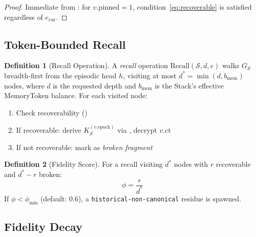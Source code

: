 \documentclass[11pt,twocolumn]{article}
\theoremstyle{definition}
\newtheorem{definition}{Definition}[section]
\theoremstyle{plain}
\theoremstyle{remark}
\begin{document}
\begin{proof}
Immediate from : for $v.\mathrm{pinned} = 1$, condition~\eqref{eq:recoverable} is satisfied regardless of $e_{\mathrm{cur}}$.
\end{proof}

\subsection{Token-Bounded Recall}

\begin{definition}[Recall Operation]\label{def:recall}
A \emph{recall} operation $\mathrm{Recall}(\mathcal{S}, d, e)$ walks $G_\mathcal{S}$ breadth-first from the episodic head $h$, visiting at most $d^* = \min(d, b_{\mathrm{mem}})$ nodes, where $d$ is the requested depth and $b_{\mathrm{mem}}$ is the Stack's effective MemoryToken balance. For each visited node:
\begin{enumerate}[leftmargin=*,itemsep=1pt]
  \item Check recoverability ()
  \item If recoverable: derive $K^{(v.\mathrm{epoch})}_\mathcal{S}$ via , decrypt $v.\mathrm{ct}$
  \item If not recoverable: mark as \emph{broken fragment}
\end{enumerate}
\end{definition}

\begin{definition}[Fidelity Score]\label{def:fidelity}
For a recall visiting $d^*$ nodes with $r$ recoverable and $d^* - r$ broken:
\begin{equation}\label{eq:fidelity}
  \phi = \frac{r}{d^*}
\end{equation}
If $\phi < \phi_{\min}$ (default: 0.6), a \texttt{historical-non-canonical} residue is spawned.
\end{definition}

\subsection{Fidelity Decay}
\end{document}
